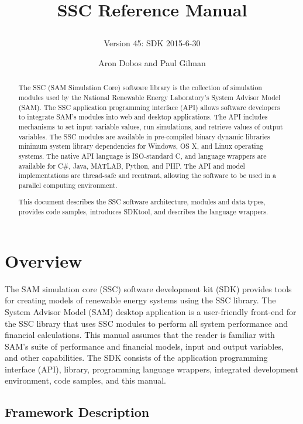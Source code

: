 \documentclass{scrartcl} %
\title{SSC Reference Manual
\subtitle{Version 45: SDK 2015-6-30}}
\author{Aron Dobos and Paul Gilman}
\begin{document}
\maketitle
\vspace{2.5in}
\begin{abstract}
The SSC (SAM Simulation Core) software library is the collection of simulation modules used by the National Renewable Energy Laboratory's  System Advisor Model (SAM).  The SSC application programming interface (API) allows software developers to integrate SAM's modules into web and desktop applications. The API includes mechanisms to set input variable values, run simulations, and retrieve values of output variables. The SSC modules are available in pre-compiled binary dynamic libraries minimum system library dependencies for Windows, OS X, and Linux operating systems. The native API language is ISO-standard C, and language wrappers are available for C\#, Java, MATLAB, Python, and PHP. The API and model implementations are thread-safe and reentrant, allowing the software to be used in a parallel computing environment.

This document describes the SSC software architecture, modules and data types, provides code samples, introduces SDKtool, and describes the language wrappers.
\end{abstract} 

\newpage
\tableofcontents
\newpage

\section{Overview}
\label{sec_overview}

The SAM simulation core (SSC) software development kit (SDK) provides tools for creating models of renewable energy systems using the SSC library. The System Advisor Model (SAM) desktop application is a user-friendly front-end for the SSC library that uses SSC modules to perform all system performance and financial calculations. This manual assumes that the reader is familiar with SAM's suite of performance and financial models, input and output variables, and other capabilities. The SDK consists of the application programming interface (API), library, programming language wrappers, integrated development environment, code samples, and this manual.

\subsection{Framework Description}
\end{document}
